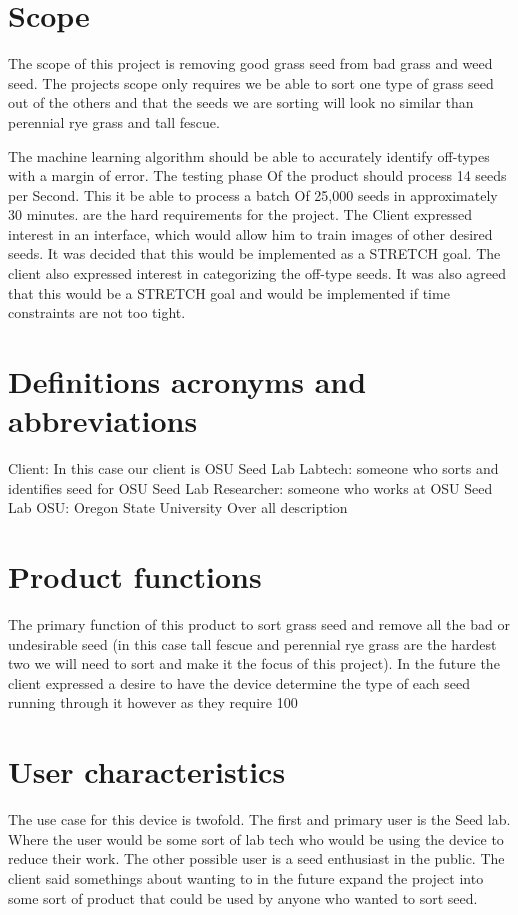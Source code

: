 \documentclass[onecolumn, draftclsnofoot,10pt, compsoc]{IEEEtran}
\begin{document}
 \section{Scope}
The scope of this project is removing good grass seed from bad grass and weed seed.
The projects scope only requires we be able to sort one type of grass seed out of the others and that the seeds we are sorting will look no similar than perennial rye grass and tall fescue.

The machine learning algorithm should be able to accurately identify off-types with a margin of error.
The testing phase Of the product should process 14 seeds per Second.
This it be able to process a batch Of 25,000 seeds in approximately 30 minutes. are the hard requirements for the project.
The Client expressed interest in an interface, which would allow him to train images of other desired seeds.
It was decided that this would be implemented as a STRETCH goal.
The client also expressed interest in categorizing the off-type seeds.
It was also agreed that this would be a STRETCH goal and would be implemented if time constraints are not too tight.
 \section{Definitions acronyms and abbreviations}
Client: In this case our client is OSU Seed Lab
Labtech: someone who sorts and identifies seed for OSU Seed Lab
Researcher: someone who works at OSU Seed Lab
OSU: Oregon State University
Over all description
\section{Product functions}
The primary function of this product to sort grass seed and remove all the bad or undesirable seed (in this case tall fescue and perennial rye grass are the hardest two we will need to sort and make it the focus of this project).
In the future the client expressed a desire to have the device determine the type of each seed running through it however as they require 100%
\section{User characteristics}
The use case for this device is twofold.
The first and primary user is the Seed lab.
Where the user would be some sort of lab tech who would be using the device to reduce their work.
The other possible user is a seed enthusiast in the public.
The client said somethings about wanting to in the future expand the project into some sort of product that could be used by anyone who wanted to sort seed.
\end{document}
